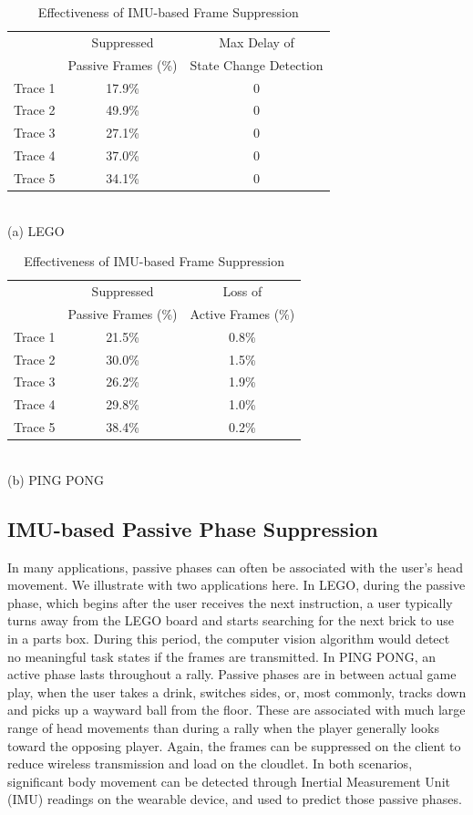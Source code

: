 \begin{table}
\small\centering
\begin{tabular}{| l | c | c |}
   \hline
        & Suppressed  &  Max Delay of \\ 
        & Passive Frames (\%)   & State Change Detection \\ \hline
    Trace 1 & 17.9\%    & 0 \\
    Trace 2 & 49.9\%    & 0 \\
    Trace 3 & 27.1\%    & 0 \\
    Trace 4 & 37.0\%    & 0 \\
    Trace 5 & 34.1\%    & 0 \\
    \hline
\end{tabular}\\[0.1in]
{\small (a) LEGO}\\[0.1in]

\begin{tabular}{| l | c | c |}
    \hline
        & Suppressed        & Loss of  \\
        & Passive Frames (\%)    & Active Frames (\%) \\ \hline
    Trace 1 & 21.5\%    &   0.8\%   \\
    Trace 2 & 30.0\%    &   1.5\%   \\
    Trace 3 & 26.2\%    &   1.9\%   \\
    Trace 4 & 29.8\%    &   1.0\%   \\
    Trace 5 & 38.4\%    &   0.2\%   \\
    \hline
\end{tabular}\\[0.1in]
{\small (b) PING PONG}\\[0.1in]
\caption{\small Effectiveness of IMU-based Frame Suppression}
\label{tab:imu-result}
\end{table}



\subsection{IMU-based Passive Phase Suppression}

In many applications, passive phases can often be associated with the
user's head movement. We illustrate with two applications here. In
LEGO, during the passive phase, which begins after the user receives
the next instruction, a user typically turns away from the LEGO board
and starts searching for the next brick to use in a parts box. During
this period, the computer vision algorithm would detect no meaningful
task states if the frames are transmitted.  In PING PONG, an active
phase lasts throughout a rally.  Passive phases are in between actual
game play, when the user takes a drink, switches sides, or, most
commonly, tracks down and picks up a wayward ball from the floor.
These are associated with much large range of head movements than
during a rally when the player generally looks toward the opposing
player.  Again, the frames can be suppressed on the client to reduce
wireless transmission and load on the cloudlet.  In both scenarios,
significant body movement can be detected through Inertial Measurement
Unit (IMU) readings on the wearable device, and used to predict those
passive phases.

